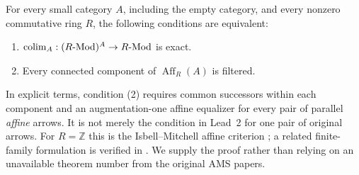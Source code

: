 \begin{theorem}\label{D:affine-exactness}
For every small category $A$, including the empty category, and every nonzero commutative ring $R$, the following conditions are equivalent:
\begin{enumerate}
\item $\operatorname{colim}_A:(R\text{-}\mathrm{Mod})^A\to R\text{-}\mathrm{Mod}$ is exact.
\item Every connected component of $\operatorname{Aff}_R(A)$ is filtered.
\end{enumerate}
In explicit terms, condition (2) requires common successors within each component and an augmentation-one affine equalizer for every pair of parallel \emph{affine} arrows. It is not merely the condition in Lead~2 for one pair of original arrows. For $R=\mathbb Z$ this is the Isbell--Mitchell affine criterion \citep{IsbellMitchell1973Exact,IsbellMitchell1976Fixed}; a related finite-family formulation is verified in \citet[Section~1, unnumbered theorem]{Isbell1968Exact}. We supply the proof rather than relying on an unavailable theorem number from the original AMS papers.
\end{theorem}
